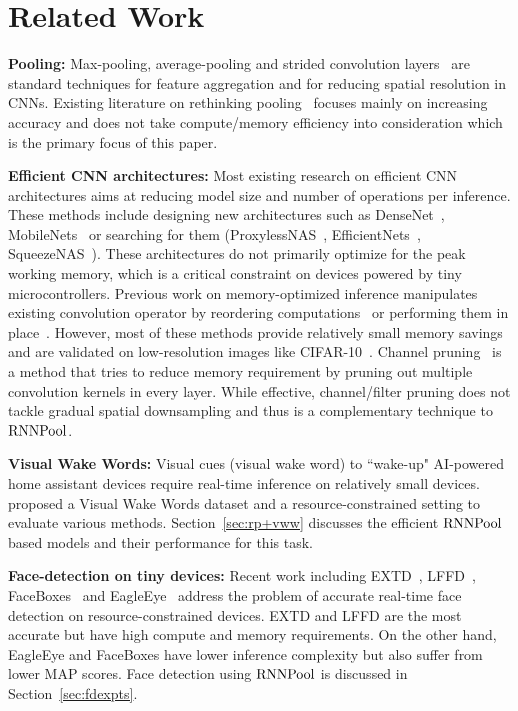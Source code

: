 \documentclass[10pt]{article}
\newcommand{\rpool}{\ensuremath{{\rm RNNPool}}\xspace}
\begin{document}
 \section{Related Work}
\label{sec:rw}
\textbf{Pooling:} Max-pooling, average-pooling and strided convolution
layers~\citep{lecun2015deep} are standard techniques for feature
aggregation and for reducing spatial resolution in CNNs. Existing
literature on rethinking pooling~\citep{zhao2018multiactivation,
  he2015spatial, gong2014multi} focuses mainly on increasing accuracy
and does not take compute/memory efficiency into consideration which
is the primary focus of this paper.

\textbf{Efficient CNN architectures:} Most existing research on
efficient CNN architectures aims at reducing model size and number of
operations per inference. These methods include designing new
architectures such as DenseNet~\citep{huang2017densely},
MobileNets~\citep{howard2017mobilenets, sandler2018mobilenetv2} or
searching for them (ProxylessNAS~\citep{cai2018proxylessnas},
EfficientNets~\citep{tan2019efficientnet},
SqueezeNAS~\citep{shaw2019squeeze}). These architectures do not
primarily optimize for the peak working memory, which is a critical
constraint on devices powered by tiny microcontrollers. Previous work
on memory-optimized inference manipulates existing convolution
operator by reordering computations~\citep{cho2017mec, lai2018cmsis}
or performing them in place~\citep{gural2019memory}. However, most of
these methods provide relatively small memory savings and are
validated on low-resolution images like
CIFAR-10~\citep{krizhevsky2009learning}. Channel
pruning~\citep{he2017channel} is a method that tries to reduce memory
requirement by pruning out multiple convolution kernels in every
layer. While effective, channel/filter pruning does not tackle gradual
spatial downsampling and thus is a complementary technique to \rpool.

\textbf{Visual Wake Words:} Visual cues (visual wake word) to
``wake-up" AI-powered home assistant devices require real-time
inference on relatively small devices. \citet{chowdhery2019visual}
proposed a Visual Wake Words dataset and a resource-constrained
setting to evaluate various methods. Section~\ref{sec:rp+vww}
discusses the efficient \rpool based models and their performance for
this task.


\textbf{Face-detection on tiny devices:} Recent work including
EXTD~\citep{yoo2019extd}, LFFD~\citep{he2019lffd},
FaceBoxes~\citep{zhang2017faceboxes} and EagleEye~\citep{zhao2019real}
address the problem of accurate real-time face detection on
resource-constrained devices. EXTD and LFFD are the most accurate but
have high compute and memory requirements. On the other hand, EagleEye
and FaceBoxes have lower inference complexity but also suffer from
lower MAP scores. Face detection using \rpool is discussed in
Section~\ref{sec:fdexpts}.
\end{document}
